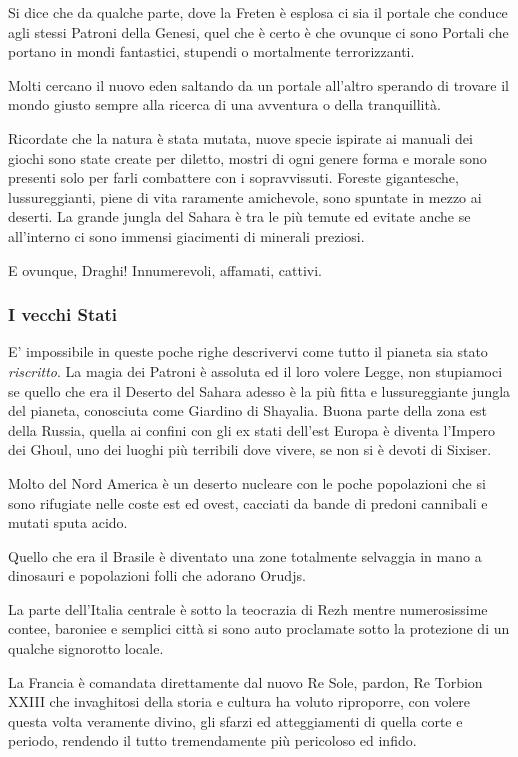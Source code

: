 \begin{multicols}{2}
Si dice che da qualche parte, dove la Freten è esplosa ci sia il portale che conduce agli stessi Patroni della Genesi, quel che è certo è che ovunque ci sono Portali che portano in mondi fantastici, stupendi o mortalmente terrorizzanti.

Molti cercano il nuovo eden saltando da un portale all'altro sperando di trovare il mondo giusto sempre alla ricerca di una avventura o della tranquillità.

Ricordate che la natura è stata mutata, nuove specie ispirate ai manuali dei giochi sono state create per diletto, mostri di ogni genere forma e morale sono presenti solo per farli combattere con i sopravvissuti. Foreste gigantesche, lussureggianti, piene di vita raramente amichevole, sono spuntate in mezzo ai deserti. La grande jungla del Sahara è tra le più temute ed evitate anche se all'interno ci sono immensi giacimenti di minerali preziosi.

E ovunque, Draghi! Innumerevoli, affamati, cattivi.


\subsubsection{I vecchi Stati}

E' impossibile in queste poche righe descrivervi come tutto il pianeta sia stato \emph{riscritto}. La magia dei Patroni è assoluta ed il loro volere Legge, non stupiamoci se quello che era il Deserto del Sahara adesso è la più fitta e lussureggiante jungla del pianeta, conosciuta come Giardino di Shayalia.
Buona parte della zona est della Russia, quella ai confini con gli ex stati dell'est Europa è diventa l'Impero dei Ghoul, uno dei luoghi più terribili dove vivere, se non si è devoti di Sixiser.

Molto del Nord America è un deserto nucleare con le poche popolazioni che si sono rifugiate nelle coste est ed ovest, cacciati da bande di predoni cannibali e mutati sputa acido.

Quello che era il Brasile è diventato una zone totalmente selvaggia in mano a dinosauri e popolazioni folli che adorano Orudjs.

La parte dell'Italia centrale è sotto la teocrazia di Rezh mentre numerosissime contee, baroniee e semplici città si sono auto proclamate sotto la protezione di un qualche signorotto locale.

La Francia è comandata direttamente dal nuovo Re Sole, pardon, Re Torbion XXIII che invaghitosi della storia e cultura ha voluto riproporre, con volere questa volta veramente divino, gli sfarzi ed atteggiamenti di quella corte e periodo, rendendo il tutto tremendamente più pericoloso ed infido.


\end{multicols}
